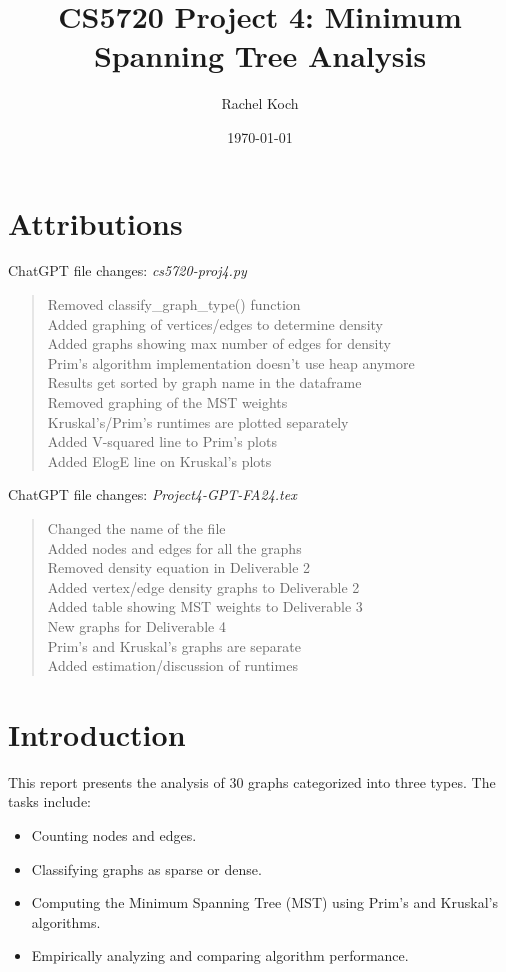 \documentclass{article}
\title{CS5720 Project 4: Minimum Spanning Tree Analysis}
\author{Rachel Koch}
\date{\today}
\begin{document}
\maketitle

\section*{Attributions}

ChatGPT file changes: \textit{cs5720-proj4.py}
\begin{quote}
    Removed classify\_graph\_type() function \\
    Added graphing of vertices/edges to determine density \\
    Added graphs showing max number of edges for density \\
    Prim's algorithm implementation doesn't use heap anymore \\
    Results get sorted by graph name in the dataframe \\
    Removed graphing of the MST weights \\
    Kruskal's/Prim's runtimes are plotted separately \\
    Added V-squared line to Prim's plots \\
    Added ElogE line on Kruskal's plots
\end{quote}
ChatGPT file changes: \textit{Project4-GPT-FA24.tex}
\begin{quote}
    Changed the name of the file \\
    Added nodes and edges for all the graphs \\
    Removed density equation in Deliverable 2 \\
    Added vertex/edge density graphs to Deliverable 2 \\
    Added table showing MST weights to Deliverable 3 \\
    New graphs for Deliverable 4 \\
    Prim's and Kruskal's graphs are separate \\
    Added estimation/discussion of runtimes
\end{quote}


\section*{Introduction}
This report presents the analysis of 30 graphs categorized into three types. The tasks include:
\begin{itemize}
    \item Counting nodes and edges.
    \item Classifying graphs as sparse or dense.
    \item Computing the Minimum Spanning Tree (MST) using Prim's and Kruskal's algorithms.
    \item Empirically analyzing and comparing algorithm performance.
\end{itemize}
\end{document}
